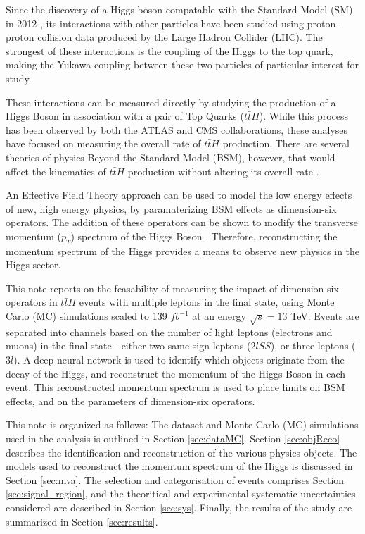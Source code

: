 Since the discovery of a Higgs boson compatable with the Standard Model (SM) in 2012 \cite{HION-2010-02}, its interactions with other particles have been studied using proton-proton collision data produced by the Large Hadron Collider (LHC). The strongest of these interactions is the coupling of the Higgs to the top quark, making the Yukawa coupling between these two particles of particular interest for study.

These interactions can be measured directly by studying the production of a Higgs Boson in association with a pair of Top Quarks ($t\bar{t}H$). While this process has been observed by both the ATLAS and CMS collaborations, these analyses have focused on measuring the overall rate of $t\bar{t}H$ production. There are several theories of physics Beyond the Standard Model (BSM), however, that would affect the kinematics of $t\bar{t}H$ production without altering its overall rate \cite{Dumont_2013}.  

An Effective Field Theory approach can be used to model the low energy effects of new, high energy physics, by paramaterizing BSM effects as dimension-six operators. The addition of these operators can be shown to modify the transverse momentum ($p_T$) spectrum of the Higgs Boson \cite{Banerjee_2014}. Therefore, reconstructing the momentum spectrum of the Higgs provides a means to observe new physics in the Higgs sector.  

This note reports on the feasability of measuring the impact of dimension-six operators in $t\bar{t}H$ events with multiple leptons in the final state, using Monte Carlo (MC) simulations scaled to 139 $fb^{-1}$ at an energy $\sqrt{s} = 13$ TeV. Events are separated into channels based on the number of light leptons (electrons and muons) in the final state - either two same-sign leptons ($2lSS$), or three leptons ($3l$). A deep neural network is used to identify which objects originate from the decay of the Higgs, and reconstruct the momentum of the Higgs Boson in each event. This reconstructed momentum spectrum is used to place limits on BSM effects, and on the parameters of dimension-six operators.

This note is organized as follows: The dataset and Monte Carlo (MC) simulations used in the analysis is outlined in Section \ref{sec:dataMC}. Section \ref{sec:objReco} describes the identification and reconstruction of the various physics objects. The models used to reconstruct the momentum spectrum of the Higgs is discussed in Section \ref{sec:mva}. The selection and categorisation of events comprises Section \ref{sec:signal_region}, and the theoritical and experimental systematic uncertainties considered are described in Section \ref{sec:sys}. Finally, the results of the study are summarized in Section \ref{sec:results}.
